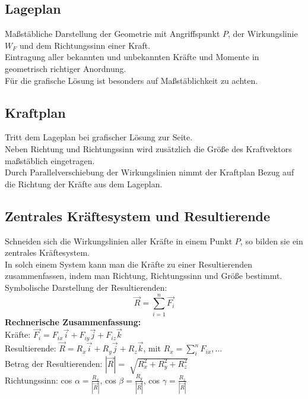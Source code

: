 \documentclass[a4paper,parskip=half*,DIV=7,fontsize=11pt]{scrartcl}
\begin{document}
\subsection{Lageplan}
Maßstäbliche Darstellung der Geometrie mit Angriffspunkt $P$, der Wirkungslinie $W_F$ und dem Richtungssinn einer Kraft.\\
Eintragung aller bekannten und unbekannten Kräfte und Momente in geometrisch richtiger Anordnung.\\
Für die grafische Lösung ist besonders auf Maßstäblichkeit zu achten.\\

\subsection{Kraftplan}
Tritt dem Lageplan bei grafischer Lösung zur Seite.\\
Neben Richtung und Richtungssinn wird zusätzlich die Größe des Kraftvektors maßstäblich eingetragen.\\
Durch Parallelverschiebung  der Wirkungslinien nimmt der Kraftplan Bezug auf die Richtung der Kräfte aus dem Lageplan.\\

\subsection{Zentrales Kräftesystem und Resultierende}
Schneiden sich die Wirkungslinien aller Kräfte in einem Punkt $P$, so bilden sie ein zentrales Kräftesystem.\\
In solch einem System kann man die Kräfte zu einer Resultierenden zusammenfassen, indem man Richtung, Richtungssinn und Größe bestimmt.\\
Symbolische Darstellung der Resultierenden: $$\overrightarrow{R}=\sum_{i=1}^n \overrightarrow{F_i}$$
\textbf{Rechnerische Zusammenfassung:}\\
Kräfte:  $\overrightarrow{F_i}=F_{ix}\overrightarrow{i}+F_{iy}\overrightarrow{j}+F_{iz}\overrightarrow{k}$\\
Resultierende: $\overrightarrow{R}=R_x\overrightarrow{i}+R_y\overrightarrow{j}+R_z\overrightarrow{k}$, mit $R_x=\sum_i^n F_{ix},...$\\
Betrag der Resultierenden: $|\overrightarrow{R}|=\sqrt[]{R_x^2+R_y^2+R_z^2}$\\
Richtungssinn: cos $\alpha=\frac{R_x}{|\overrightarrow{R}|}$, cos $\beta=\frac{R_y}{|\overrightarrow{R}|}$, cos $\gamma=\frac{R_z}{|\overrightarrow{R}|}$
\end{document}
